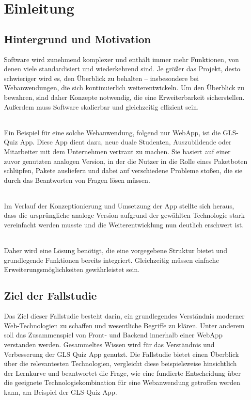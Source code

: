 \documentclass[biblatex]{lni}
\begin{document}
\section{Einleitung}

\subsection{Hintergrund und Motivation}
Software wird zunehmend komplexer und enthält immer mehr Funktionen, von denen viele standardisiert und wiederkehrend sind.
Je größer das Projekt, desto schwieriger wird es, den Überblick zu behalten – insbesondere bei Webanwendungen,
die sich kontinuierlich weiterentwickeln.
Um den Überblick zu bewahren, sind daher Konzepte notwendig, die eine Erweiterbarkeit sicherstellen.
Außerdem muss Software skalierbar und gleichzeitig effizient sein.

\\

Ein Beispiel für eine solche Webanwendung, folgend nur WebApp, ist die GLS-Quiz App.
Diese App dient dazu, neue duale Studenten, Auszubildende oder Mitarbeiter mit dem Unternehmen vertraut zu machen.
Sie basiert auf einer zuvor genutzten analogen Version, in der die Nutzer in die Rolle eines Paketboten schlüpfen,
Pakete ausliefern und dabei auf verschiedene Probleme stoßen, die sie durch das Beantworten von Fragen lösen müssen.

\\

Im Verlauf der Konzeptionierung und Umsetzung der App stellte sich heraus,
dass die ursprüngliche analoge Version aufgrund der gewählten Technologie stark vereinfacht werden musste
und die Weiterentwicklung nun deutlich erschwert ist.

\\

Daher wird eine Lösung benötigt,
die eine vorgegebene Struktur bietet und grundlegende Funktionen bereits integriert.
Gleichzeitig müssen einfache Erweiterungsmöglichkeiten gewährleistet sein.

\subsection{Ziel der Fallstudie}

Das Ziel dieser Fallstudie besteht darin,
ein grundlegendes Verständnis moderner Web-Technologien zu schaffen und wesentliche Begriffe zu klären.
Unter anderem soll das Zusammenspiel von Front- und Backend innerhalb einer \ac{WebApp} verstanden werden.
Gesammeltes Wissen wird für das Verständnis und Verbesserung der GLS Quiz App genutzt.
Die Fallstudie bietet einen Überblick über die relevantesten Technologien,
vergleicht diese beispielsweise hinsichtlich der Lernkurve
und beantwortet die Frage,
wie eine fundierte Entscheidung über die geeignete Technologiekombination für eine Webanwendung getroffen werden kann,
am Beispiel der GLS-Quiz App.
\end{document}
